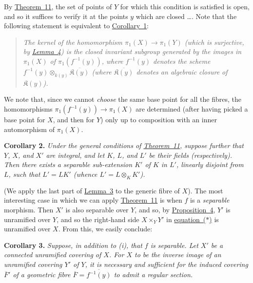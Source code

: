 \documentclass{article}
\newenvironment{itenv}[1]
  {\phantomsection\par\medskip\noindent\textbf{#1.}\itshape}
  {\par\medskip}
\newcommand{\kres}{\mathfrak{K}}
\begin{document}
By \hyperref[theorem11]{Theorem~11}, the set of points of $Y$ for which this condition is satisfied is open, and so it suffices to verify it at the points $y$ which are closed \ldots.
Note that the following statement is equivalent to \hyperref[theorem11corollary1]{Corollary~1}:
\begin{quote}
  \itshape
  The kernel of the homomorphism $\pi_1(X)\to\pi_1(Y)$ (which is surjective, by \hyperref[lemma4]{Lemma~4}) is the closed invariant subgroup generated by the images in $\pi_1(X)$ of $\pi_1(f^{-1}(y))$, where $f^{-1}(y)$ denotes the scheme $f^{-1}(y)\otimes_{k(y)}\overline{\kres(y)}$ (where $\overline{\kres(y)}$ denotes an algebraic closure of $\kres(y)$).
\end{quote}
We note that, since we cannot \emph{choose} the same base point for all the fibres, the homomorphisms $\pi_1(f^{-1}(y))\to\pi_1(X)$ are determined (after having picked a base point for $X$, and then for $Y$) only up to composition with an inner automorphism of $\pi_1(X)$.

\begin{itenv}{Corollary 2}
\label{theorem11corollary2}
  Under the general conditions of \hyperref[theorem11]{Theorem~11}, suppose further that $Y$, $X$, and $X'$ are integral, and let $K$, $L$, and $L'$ be their fields (respectively).
  Then there exists a separable sub-extension $K'$ of $K$ in $L'$, linearly disjoint from $L$, such that $L'=LK'$ (whence $L'=L\otimes_KK'$).
\end{itenv}

(We apply the last part of \hyperref[lemma3]{Lemma~3} to the generic fibre of $X$).
The most interesting case in which we can apply \hyperref[theorem11]{Theorem~11} is when $f$ is a \emph{separable} morphism.
Then $X'$ is also separable over $Y$, and so, by \hyperref[proposition4]{Proposition~4}, $Y'$ is unramified over $Y$, and so the right-hand side $X\times_YY'$ in \hyperref[equation*]{equation~($*$)} is unramified over $X$.
From this, we easily conclude:

\begin{itenv}{Corollary 3}
\label{theorem11corollary3}
  Suppose, in addition to (i), that $f$ is separable.
  Let $X'$ be a connected unramified covering of $X$.
  For $X$ to be the inverse image of an unramified covering $Y'$ of $Y$, it is necessary and sufficient for the induced covering $\overline{F}'$ of a geometric fibre $\overline{F}=\overline{f^{-1}(y)}$ to admit a regular section.
\end{itenv}
\end{document}
